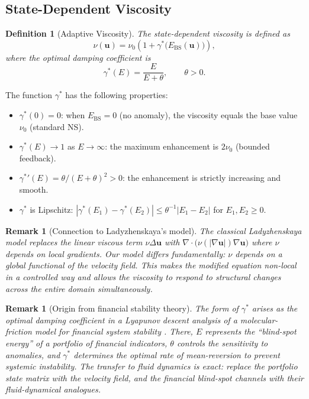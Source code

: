 \documentclass[12pt, a4paper]{article}
\newtheorem{definition}[theorem]{Definition}
\newtheorem{remark}[theorem]{Remark}
\newcommand{\Ebs}{E_{\mathrm{BS}}}
\newcommand{\gammastar}{\gamma^*}
\begin{document}
\subsection{State-Dependent Viscosity}

\begin{definition}[Adaptive Viscosity]\label{def:adaptive_nu}
The state-dependent viscosity is defined as
\begin{equation}\label{eq:nu_adaptive}
\nu(\mathbf{u}) = \nu_0 \left(1 + \gammastar\bigl(\Ebs(\mathbf{u})\bigr)\right),
\end{equation}
where the optimal damping coefficient is
\begin{equation}\label{eq:gamma_star}
\gammastar(E) = \frac{E}{E + \theta}, \qquad \theta > 0.
\end{equation}
\end{definition}

The function $\gammastar$ has the following properties:
\begin{itemize}
\item $\gammastar(0) = 0$: when $\Ebs = 0$ (no anomaly),
  the viscosity equals the base value $\nu_0$ (standard NS).
\item $\gammastar(E) \to 1$ as $E \to \infty$:
  the maximum enhancement is $2\nu_0$ (bounded feedback).
\item ${\gammastar}'(E) = \theta/(E+\theta)^2 > 0$:
  the enhancement is strictly increasing and smooth.
\item $\gammastar$ is Lipschitz: $|\gammastar(E_1) - \gammastar(E_2)|
  \leq \theta^{-1} |E_1 - E_2|$ for $E_1, E_2 \geq 0$.
\end{itemize}

\begin{remark}[Connection to Ladyzhenskaya's model]
The classical Ladyzhenskaya model \cite{lady1969} replaces the
linear viscous term $\nu\Delta\mathbf{u}$ with
$\nabla \cdot \bigl(\nu(|\nabla\mathbf{u}|) \nabla\mathbf{u}\bigr)$
where $\nu$ depends on \emph{local} gradients.
Our model differs fundamentally: $\nu$ depends on a
\emph{global functional} of the velocity field.
This makes the modified equation non-local in a controlled way
and allows the viscosity to respond to structural changes
across the entire domain simultaneously.
\end{remark}

\begin{remark}[Origin from financial stability theory]
The form of $\gammastar$ arises as the optimal damping coefficient
in a Lyapunov descent analysis of a molecular-friction model
for financial system stability \cite{odeyemi2025mfls}.
There, $E$ represents the ``blind-spot energy'' of a portfolio
of financial indicators, $\theta$ controls the sensitivity to
anomalies, and $\gammastar$ determines the optimal rate of
mean-reversion to prevent systemic instability.
The transfer to fluid dynamics is exact: replace the portfolio
state matrix with the velocity field, and the financial
blind-spot channels with their fluid-dynamical analogues.
\end{remark}
\end{document}
